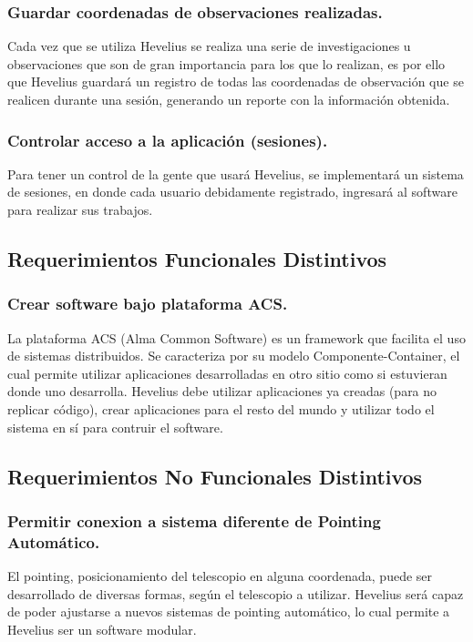 \documentclass[letterpaper,spanish,10pt]{article}
\begin{document}
\subsubsection{Guardar coordenadas de observaciones realizadas.}
Cada vez que se utiliza Hevelius se realiza una serie de investigaciones u observaciones que son de gran importancia para los que lo realizan, es por ello que Hevelius guardar\'a un registro de todas las coordenadas de observaci\'on que se realicen durante una sesi\'on, generando un reporte con la informaci\'on obtenida.

\subsubsection{Controlar acceso a la aplicaci\'on (sesiones).}
Para tener un control de la gente que usar\'a Hevelius, se implementar\'a un sistema de sesiones, en donde cada usuario debidamente registrado, ingresar\'a al software para realizar sus trabajos.


\subsection{Requerimientos Funcionales Distintivos}
\subsubsection{Crear software bajo plataforma ACS.}
La plataforma ACS (Alma Common Software) es un framework que facilita el uso de sistemas distribuidos. Se caracteriza por su modelo Componente-Container, el cual permite utilizar aplicaciones desarrolladas en otro sitio como si estuvieran donde uno desarrolla. Hevelius debe utilizar aplicaciones ya creadas (para no replicar c\'odigo), crear aplicaciones para el resto del mundo y utilizar todo el sistema en s\'i para contruir el software.


\subsection{Requerimientos No Funcionales Distintivos}
\subsubsection{Permitir conexion a sistema diferente de Pointing Autom\'atico.}
El pointing, posicionamiento del telescopio en alguna coordenada, puede ser desarrollado de diversas formas, seg\'un el telescopio a utilizar. Hevelius ser\'a capaz de poder ajustarse a nuevos sistemas de pointing autom\'atico, lo cual permite a Hevelius ser un software modular.
\end{document}
